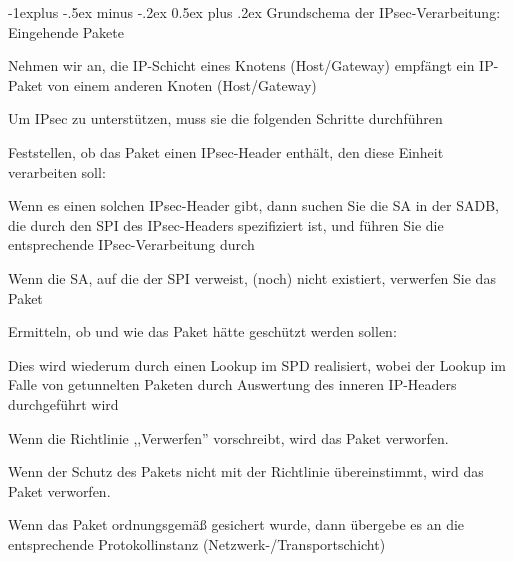 \documentclass[a4paper]{article}
\makeatletter
\renewcommand{\subsection}{\@startsection{subsection}{2}{0mm}%
 {-1explus -.5ex minus -.2ex}%
 {0.5ex plus .2ex}%
 {\normalfont\normalsize\bfseries}}
\makeatother
\begin{document}
\begin{multicols}{3}
      \subsection{Grundschema der IPsec-Verarbeitung: Eingehende Pakete}
      \begin{itemize*}
            \item Nehmen wir an, die IP-Schicht eines Knotens (Host/Gateway) empfängt ein IP-Paket von einem anderen Knoten (Host/Gateway)
            \item Um IPsec zu unterstützen, muss sie die folgenden Schritte durchführen
            \item Feststellen, ob das Paket einen IPsec-Header enthält, den diese Einheit verarbeiten soll:
            \begin{itemize*}
                  \item Wenn es einen solchen IPsec-Header gibt, dann suchen Sie die SA in der SADB, die durch den SPI des IPsec-Headers spezifiziert ist, und führen Sie die entsprechende IPsec-Verarbeitung durch
                  \item Wenn die SA, auf die der SPI verweist, (noch) nicht existiert, verwerfen Sie das Paket
            \end{itemize*}
            \item Ermitteln, ob und wie das Paket hätte geschützt werden sollen:
            \begin{itemize*}
                  \item Dies wird wiederum durch einen Lookup im SPD realisiert, wobei der Lookup im Falle von getunnelten Paketen durch Auswertung des inneren IP-Headers durchgeführt wird
                  \item Wenn die Richtlinie ,,Verwerfen'' vorschreibt, wird das Paket verworfen.
                  \item Wenn der Schutz des Pakets nicht mit der Richtlinie übereinstimmt, wird das Paket verworfen.
                  \item Wenn das Paket ordnungsgemäß gesichert wurde, dann übergebe es an die entsprechende Protokollinstanz (Netzwerk-/Transportschicht)
            \end{itemize*}
      \end{itemize*}


\end{multicols}
\end{document}
